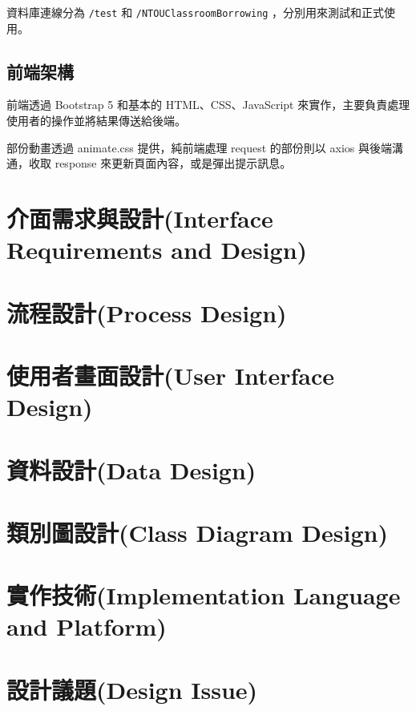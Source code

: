 \documentclass{article}
\begin{document}
資料庫連線分為 \verb|/test| 和 \verb|/NTOUClassroomBorrowing| ，分別用來測試和正式使用。

\subsection{前端架構}

前端透過 Bootstrap 5 和基本的 HTML、CSS、JavaScript 來實作，主要負責處理使用者的操作並將結果傳送給後端。

部份動畫透過 animate.css 提供，純前端處理 request 的部份則以 axios 與後端溝通，收取 response 來更新頁面內容，或是彈出提示訊息。

\newpage

\section[介面需求與設計(INTERFACE REQUIREMENTS AND DESIGN)]{介面需求與設計(Interface Requirements and Design)}

\newpage

\section[流程設計(PROCESS DESIGN)]{流程設計(Process Design)}

\newpage

\section[使用者畫面設計(USER INTERFACE DESIGN)]{使用者畫面設計(User Interface Design)}

\newpage

\section[資料設計(DATA DESIGN)]{資料設計(Data Design)}

\newpage

\section[類別圖設計(CLASS DIAGRAM DESIGN)]{類別圖設計(Class Diagram Design)}

\newpage

\section[實作技術(IMPLEMENTATION LANGUAGE AND PLATFORM)]{實作技術(Implementation Language and Platform)}

\newpage

\section[設計議題(DESIGN ISSUE)]{設計議題(Design Issue)}
\end{document}
